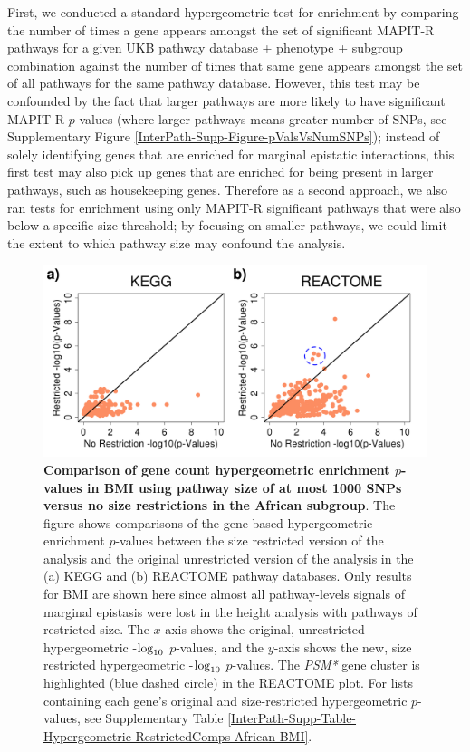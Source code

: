 \documentclass[12pt,a4paper]{article}
\def\log{{\rm log}}
\begin{document}
First, we conducted a standard hypergeometric test for enrichment by comparing the number of times a gene appears amongst the set of significant MAPIT-R pathways for a given UKB pathway database + phenotype + subgroup combination against the number of times that same gene appears amongst the set of all pathways for the same pathway database. However, this test may be confounded by the fact that larger pathways are more likely to have significant MAPIT-R $p$-values (where larger pathways means greater number of SNPs, see Supplementary Figure \ref{InterPath-Supp-Figure-pValsVsNumSNPs}); instead of solely identifying genes that are enriched for marginal epistatic interactions, this first test may also pick up genes that are enriched for being present in larger pathways, such as housekeeping genes. Therefore as a second approach, we also ran tests for enrichment using only MAPIT-R significant pathways that were also below a specific size threshold; by focusing on smaller pathways, we could limit the extent to which pathway size may confound the analysis. 

\begin{figure}[htbp]
\centering
\includegraphics[scale=.4]{Images/Main/InterPath_Main_Figure_Hypergeometric_RestrictedComps_African_BMI_vs3.png}
\caption[TBD]{\textbf{Comparison of gene count hypergeometric enrichment $p$-values in BMI using pathway size of at most 1000 SNPs versus no size restrictions in the African subgroup}. The figure shows comparisons of the gene-based hypergeometric enrichment $p$-values between the size restricted version of the analysis and the original unrestricted version of the analysis in the (a) KEGG and (b) REACTOME pathway databases. Only results for BMI are shown here since almost all pathway-levels signals of marginal epistasis were lost in the height analysis with pathways of restricted size. The $x$-axis shows the original, unrestricted hypergeometric -$\log_{10}$ $p$-values, and the $y$-axis shows the new, size restricted hypergeometric -$\log_{10}$ $p$-values. The \textit{PSM*} gene cluster is highlighted (blue dashed circle) in the REACTOME plot. For lists containing each gene's original and  size-restricted hypergeometric $p$-values, see Supplementary Table \ref{InterPath-Supp-Table-Hypergeometric-RestrictedComps-African-BMI}.}
\label{InterPath-Main-Figure-Hypergeometric-RestrictedComps-African-BMI}
\end{figure}
\clearpage
\end{document}
